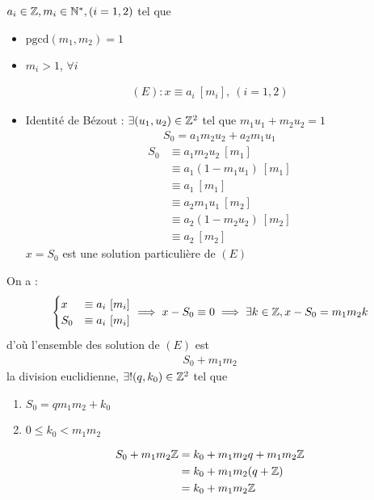 \begin{remarque}
$a_i \in \mathbb{Z}, m_i \in \mathbb{N}^*, (i = 1, 2)$ tel que
\begin{itemize}
    \item $\mathrm{pgcd}(m_1, m_2) = 1$
    \item $m_i > 1$, $\forall i$
\end{itemize}
\begin{align*}
    (E) \colon x \equiv a_i \ [m_i],\ (i=1,2)
\end{align*}
\begin{itemize}
    \item Identité de Bézout : $\exists (u_1, u_2) \in \mathbb{Z}^2$ tel que $m_1u_1 + m_2u_2 = 1$
\begin{align*}
S_0 = a_1m_2u_2 + a_2m_1u_1
\end{align*}
\begin{align*}
    S_0 &\equiv a_1 m_2 u_2 \ [m_1] \\
        &\equiv a_1(1 - m_1 u_1) \ [m_1] \\
        &\equiv a_1 \ [m_1] \\
        &\equiv a_2 m_1 u_1 \ [m_2] \\
        &\equiv a_2 (1 - m_2 u_2) \ [m_2] \\
        &\equiv a_2 \ [m_2]
\end{align*}
$x = S_0$ est une solution particulière de $(E)$
\end{itemize}
On a :
\begin{align*}
    \begin{cases}
x &\equiv a_i \ [m_i] \\
      S_0 &\equiv a_i \ [m_i]
    \end{cases}
    \implies 
    x - S_0 \equiv 0 \implies \exists k \in \mathbb{Z}, x - S_0 = m_1 m_2 k
\end{align*} 
d'où l'ensemble des solution de $(E)$ est 
\begin{align*}
S_0 + m_1 m_2
\end{align*}
la division euclidienne, $\exists ! (q, k_0) \in \mathbb{Z}^2$ tel que
\begin{enumerate}
    \item $S_0 = q m_1 m_2 + k_0$ 
    \item $0 \leq k_0 < m_1 m_2$
\end{enumerate}
\begin{align*}
    S_0 + m_1 m_2 \mathbb{Z} &= k_0 + m_1 m_2 q + m_1 m_2 \mathbb{Z} \\
                     &= k_0 + m_1 m_2 (q + \mathbb{Z}) \\ 
                     &= k_0 + m_1 m_2 \mathbb{Z}
\end{align*}
\end{remarque}


